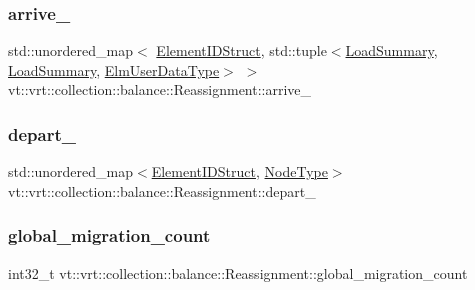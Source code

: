 \subsubsection{\texorpdfstring{arrive\+\_\+}{arrive\_}}
{\footnotesize\ttfamily std\+::unordered\+\_\+map$<$ \hyperlink{namespacevt_1_1vrt_1_1collection_1_1balance_a9f5b53fafb270212279a4757d2c4cd28}{Element\+I\+D\+Struct}, std\+::tuple$<$\hyperlink{structvt_1_1vrt_1_1collection_1_1balance_1_1_load_summary}{Load\+Summary}, \hyperlink{structvt_1_1vrt_1_1collection_1_1balance_1_1_load_summary}{Load\+Summary}, \hyperlink{namespacevt_1_1vrt_1_1collection_1_1balance_abf9eea0f4c24e41036ab844025e7d4c8}{Elm\+User\+Data\+Type}$>$ $>$ vt\+::vrt\+::collection\+::balance\+::\+Reassignment\+::arrive\+\_\+}

\mbox{\label{structvt_1_1vrt_1_1collection_1_1balance_1_1_reassignment_a8fa0e732209e0f186eb10a15b29a0914}} 
\subsubsection{\texorpdfstring{depart\+\_\+}{depart\_}}
{\footnotesize\ttfamily std\+::unordered\+\_\+map$<$\hyperlink{namespacevt_1_1vrt_1_1collection_1_1balance_a9f5b53fafb270212279a4757d2c4cd28}{Element\+I\+D\+Struct}, \hyperlink{namespacevt_a866da9d0efc19c0a1ce79e9e492f47e2}{Node\+Type}$>$ vt\+::vrt\+::collection\+::balance\+::\+Reassignment\+::depart\+\_\+}

\mbox{\label{structvt_1_1vrt_1_1collection_1_1balance_1_1_reassignment_a4887608a57a19a896481f22d2ad11ce2}} 
\subsubsection{\texorpdfstring{global\+\_\+migration\+\_\+count}{global\_migration\_count}}
{\footnotesize\ttfamily int32\+\_\+t vt\+::vrt\+::collection\+::balance\+::\+Reassignment\+::global\+\_\+migration\+\_\+count}


